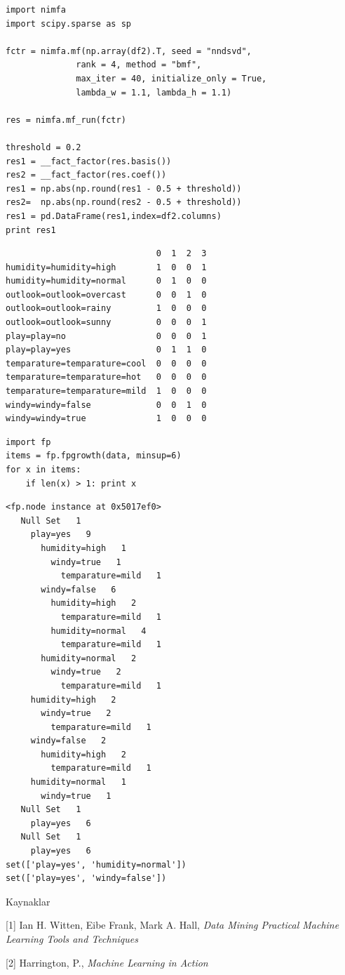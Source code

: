 \documentclass[12pt,fleqn]{article}\usepackage{../common}
\begin{document}
\begin{verbatim}
import nimfa
import scipy.sparse as sp

fctr = nimfa.mf(np.array(df2).T, seed = "nndsvd", 
              rank = 4, method = "bmf", 
              max_iter = 40, initialize_only = True,
              lambda_w = 1.1, lambda_h = 1.1)

res = nimfa.mf_run(fctr)

threshold = 0.2
res1 = __fact_factor(res.basis())
res2 = __fact_factor(res.coef())
res1 = np.abs(np.round(res1 - 0.5 + threshold))
res2=  np.abs(np.round(res2 - 0.5 + threshold))
res1 = pd.DataFrame(res1,index=df2.columns)
print res1
\end{verbatim}

\begin{verbatim}
                              0  1  2  3
humidity=humidity=high        1  0  0  1
humidity=humidity=normal      0  1  0  0
outlook=outlook=overcast      0  0  1  0
outlook=outlook=rainy         1  0  0  0
outlook=outlook=sunny         0  0  0  1
play=play=no                  0  0  0  1
play=play=yes                 0  1  1  0
temparature=temparature=cool  0  0  0  0
temparature=temparature=hot   0  0  0  0
temparature=temparature=mild  1  0  0  0
windy=windy=false             0  0  1  0
windy=windy=true              1  0  0  0
\end{verbatim}

\begin{verbatim}
import fp
items = fp.fpgrowth(data, minsup=6)
for x in items:
    if len(x) > 1: print x
\end{verbatim}

\begin{verbatim}
<fp.node instance at 0x5017ef0>
   Null Set   1
     play=yes   9
       humidity=high   1
         windy=true   1
           temparature=mild   1
       windy=false   6
         humidity=high   2
           temparature=mild   1
         humidity=normal   4
           temparature=mild   1
       humidity=normal   2
         windy=true   2
           temparature=mild   1
     humidity=high   2
       windy=true   2
         temparature=mild   1
     windy=false   2
       humidity=high   2
         temparature=mild   1
     humidity=normal   1
       windy=true   1
   Null Set   1
     play=yes   6
   Null Set   1
     play=yes   6
set(['play=yes', 'humidity=normal'])
set(['play=yes', 'windy=false'])
\end{verbatim}

Kaynaklar

[1] Ian H. Witten, Eibe Frank, Mark A. Hall, {\em Data Mining Practical Machine Learning Tools and Techniques}

[2] Harrington, P., {\em Machine Learning in Action}
\end{document}
